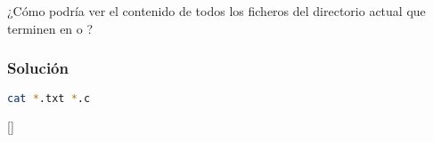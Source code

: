 ¿Cómo podría ver el contenido de todos los ficheros del directorio actual que terminen en  o ?

\subsubsection{Solución}

\begin{lstlisting}[language=sh]
cat *.txt *.c
\end{lstlisting}

\titleformat{\subsection}[block]{\normalfont\bfseries\Large}{\aqademia@subsection\thesubsection:\ }{0pt}{}[]
